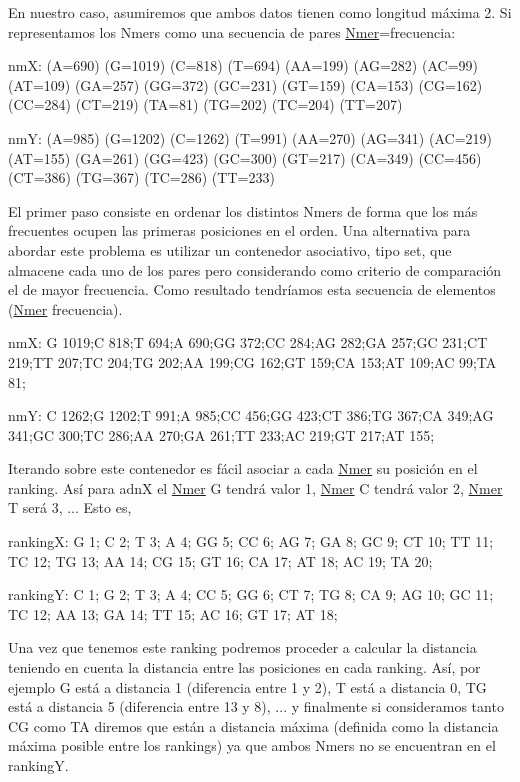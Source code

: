 En nuestro caso, asumiremos que ambos datos tienen como longitud máxima 2. Si representamos los Nmers como una secuencia de pares \hyperlink{classNmer}{Nmer}=frecuencia\+:

\begin{DoxyItemize}
\item nmX\+: (A=690) (G=1019) (C=818) (T=694) (AA=199) (AG=282) (AC=99) (AT=109) (GA=257) (GG=372) (GC=231) (GT=159) (CA=153) (CG=162) (CC=284) (CT=219) (TA=81) (TG=202) (TC=204) (TT=207) \item nmY\+: (A=985) (G=1202) (C=1262) (T=991) (AA=270) (AG=341) (AC=219) (AT=155) (GA=261) (GG=423) (GC=300) (GT=217) (CA=349) (CC=456) (CT=386) (TG=367) (TC=286) (TT=233)\end{DoxyItemize}
El primer paso consiste en ordenar los distintos Nmers de forma que los más frecuentes ocupen las primeras posiciones en el orden. Una alternativa para abordar este problema es utilizar un contenedor asociativo, tipo set, que almacene cada uno de los pares pero considerando como criterio de comparación el de mayor frecuencia. Como resultado tendríamos esta secuencia de elementos (\hyperlink{classNmer}{Nmer} frecuencia).

\begin{DoxyItemize}
\item nmX\+: G 1019;C 818;T 694;A 690;GG 372;CC 284;AG 282;GA 257;GC 231;CT 219;TT 207;TC 204;TG 202;AA 199;CG 162;GT 159;CA 153;AT 109;AC 99;TA 81; \item nmY\+: C 1262;G 1202;T 991;A 985;CC 456;GG 423;CT 386;TG 367;CA 349;AG 341;GC 300;TC 286;AA 270;GA 261;TT 233;AC 219;GT 217;AT 155;\end{DoxyItemize}
Iterando sobre este contenedor es fácil asociar a cada \hyperlink{classNmer}{Nmer} su posición en el ranking. Así para adnX el \hyperlink{classNmer}{Nmer} G tendrá valor 1, \hyperlink{classNmer}{Nmer} C tendrá valor 2, \hyperlink{classNmer}{Nmer} T será 3, ... Esto es,

\begin{DoxyItemize}
\item rankingX\+: G 1; C 2; T 3; A 4; GG 5; CC 6; AG 7; GA 8; GC 9; CT 10; TT 11; TC 12; TG 13; AA 14; CG 15; GT 16; CA 17; AT 18; AC 19; TA 20; \item rankingY\+: C 1; G 2; T 3; A 4; CC 5; GG 6; CT 7; TG 8; CA 9; AG 10; GC 11; TC 12; AA 13; GA 14; TT 15; AC 16; GT 17; AT 18;\end{DoxyItemize}
Una vez que tenemos este ranking podremos proceder a calcular la distancia teniendo en cuenta la distancia entre las posiciones en cada ranking. Así, por ejemplo G está a distancia 1 (diferencia entre 1 y 2), T está a distancia 0, TG está a distancia 5 (diferencia entre 13 y 8), ... y finalmente si consideramos tanto CG como TA diremos que están a distancia máxima (definida como la distancia máxima posible entre los rankings) ya que ambos Nmers no se encuentran en el rankingY.

